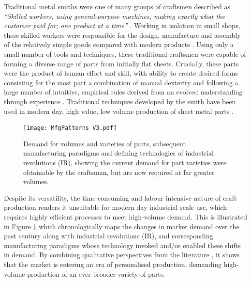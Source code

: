 Traditional metal smiths were one of many groups of craftsmen described as \textit{``Skilled workers, using general-purpose machines, making exactly what the customer paid for; one product at a time''} \citep{Koren2010TheRevolution}. Working in isolation in small shops, these skilled workers were responsible for the design, manufacture and assembly of the relatively simple goods compared with modern products \citep{Groover2015AutomationEdition}.  Using only a small number of tools and techniques, these traditional craftsmen were capable of forming a diverse range of parts from initially flat sheets. Crucially, these parts were the product of human effort and skill, with ability to create desired forms consisting for the most part a combination of manual dexterity and following a large number of intuitive, empirical rules derived from an evolved understanding through experience \citep{Hall1961EngineeringRevolution}. Traditional techniques developed by the smith have been used in modern day, high value, low volume production of sheet metal parts \citep{Amos2015Bloodhoundfeathers}.

\begin{figure}[h]
	\centering
	\texttt{[image: MfgPatterns\_V3.pdf]}
	\caption{Demand for volumes and varieties of parts, subsequent manufacturing paradigms and defining technologies of industrial revolutions (IR), showing the current demand for part varieties were obtainable by the craftsman, but are now required at far greater volumes.}
	\label{fig:VarietyVolume}
\end{figure}

Despite its versatility, the time-consuming and labour intensive nature of craft production renders it unsuitable for modern day industrial scale use, which requires highly efficient processes to meet high-volume demand. This is illustrated in Figure \ref{fig:VarietyVolume} which chronologically maps the changes in market demand over the past century  along with industrial revolutions (IR), and corresponding manufacturing paradigms whose technology invoked and/or enabled these shifts in demand. By combining qualitative perspectives from the literature \citep{Koren2010TheRevolution,Popkova2019FundamentalRevolutions,Mourtzis2012DecentralizedOutlook,Mourtzis2014TheCustomisation}, it shows that the market is entering an era of personalised production, demanding high-volume production of an ever broader variety of parts. 

